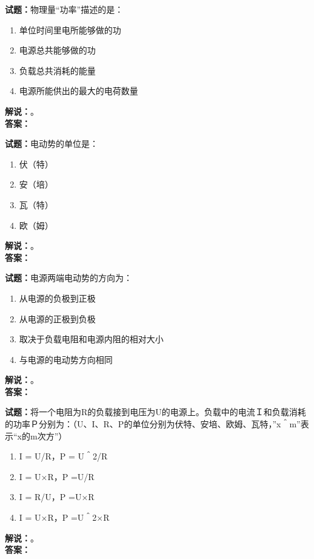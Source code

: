 \documentclass{ctexbook}
\begin{document}
\bigskip




\noindent\textbf{试题：}物理量“功率”描述的是：
\begin{enumerate}[leftmargin=3em]
\item 单位时间里电所能够做的功
\item 电源总共能够做的功
\item 负载总共消耗的能量
\item 电源所能供出的最大的电荷数量
\end{enumerate}
\noindent\textbf{解说：}\textbf{}。\\\noindent\textbf{答案：}

\bigskip




\noindent\textbf{试题：}电动势的单位是：
\begin{enumerate}[leftmargin=3em]
\item 伏（特）
\item 安（培）
\item 瓦（特）
\item 欧（姆）
\end{enumerate}
\noindent\textbf{解说：}\textbf{}。\\\noindent\textbf{答案：}

\bigskip




\noindent\textbf{试题：}电源两端电动势的方向为：
\begin{enumerate}[leftmargin=3em]
\item 从电源的负极到正极
\item 从电源的正极到负极
\item 取决于负载电阻和电源内阻的相对大小
\item 与电源的电动势方向相同
\end{enumerate}
\noindent\textbf{解说：}\textbf{}。\\\noindent\textbf{答案：}

\bigskip




\noindent\textbf{试题：}将一个电阻为R的负载接到电压为U的电源上。负载中的电流Ｉ和负载消耗的功率Ｐ分别为：（U、I、R、P的单位分别为伏特、安培、欧姆、瓦特，”x＾m”表示“x的m次方”）
\begin{enumerate}[leftmargin=3em]
\item I = U/R，P = U＾2/R
\item I = U×R，P =U/R
\item I = R/U，P =U×R
\item I = U×R，P =U＾2×R
\end{enumerate}
\noindent\textbf{解说：}\textbf{}。\\\noindent\textbf{答案：}
\end{document}
